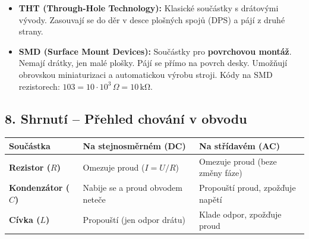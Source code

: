 \documentclass[a4paper,10pt]{article}
\begin{document}
\begin{vysvetlenibox}
\begin{itemize}
    \item \textbf{THT (Through-Hole Technology):} Klasické součástky s drátovými vývody. Zasouvají se do děr v desce plošných spojů (DPS) a pájí z druhé strany.
    \item \textbf{SMD (Surface Mount Devices):} Součástky pro \textbf{povrchovou montáž}. Nemají drátky, jen malé plošky. Pájí se přímo na povrch desky. Umožňují obrovskou miniaturizaci a automatickou výrobu stroji. Kódy na SMD rezistorech: $103 = 10 \cdot 10^3\,\Omega = 10\,\mathrm{k\Omega}$.
\end{itemize}

\subsection*{8. Shrnutí – Přehled chování v obvodu}

\begin{center}
\begin{tabularx}{0.97\linewidth}{@{} l X X @{}}
\toprule
\textbf{Součástka} & \textbf{Na stejnosměrném (DC)} & \textbf{Na střídavém (AC)} \\
\midrule
\textbf{Rezistor ($R$)} & Omezuje proud ($I = U/R$) & Omezuje proud (beze změny fáze) \\
\textbf{Kondenzátor ($C$)} & Nabije se a proud obvodem neteče & Propouští proud, zpožďuje napětí \\
\textbf{Cívka ($L$)} & Propouští (jen odpor drátu) & Klade odpor, zpožďuje proud \\
\bottomrule
\end{tabularx}
\end{center}

\end{vysvetlenibox}
\end{document}
